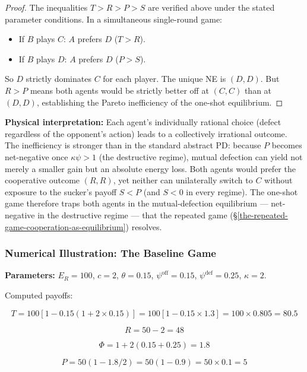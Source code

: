 \documentclass[11pt]{article}
\theoremstyle{plain}
\theoremstyle{definition}
\theoremstyle{remark}
\let\origsubsubsection\subsubsection
\renewcommand{\subsubsection}{\needspace{4\baselineskip}\origsubsubsection}
\begin{document}
\begin{proof}
The inequalities $T > R > P > S$ are verified above under the stated parameter conditions. In a simultaneous single-round game:

\begin{itemize}
\item If $B$ plays $C$: $A$ prefers $D$ ($T > R$).
\item If $B$ plays $D$: $A$ prefers $D$ ($P > S$).
\end{itemize}

So $D$ strictly dominates $C$ for each player. The unique NE is $(D, D)$. But $R > P$ means both agents would be strictly better off at $(C, C)$ than at $(D, D)$, establishing the Pareto inefficiency of the one-shot equilibrium.
\end{proof}

\textbf{Physical interpretation:} Each agent's individually rational
choice (defect regardless of the opponent's action) leads to a
collectively irrational outcome. The inefficiency is stronger than in
the standard abstract PD: because \(P\) becomes net-negative once
\(\kappa\psi > 1\) (the destructive regime), mutual defection can yield
not merely a smaller gain but an absolute energy loss. Both agents would
prefer the cooperative outcome \((R, R)\), yet neither can unilaterally
switch to \(C\) without exposure to the sucker's payoff \(S < P\) (and
\(S < 0\) in every regime). The one-shot game therefore traps both
agents in the mutual-defection equilibrium --- net-negative in the
destructive regime --- that the repeated game
(§\ref{the-repeated-game-cooperation-as-equilibrium}) resolves.

\subsubsection{Numerical Illustration: The Baseline
Game}\label{numerical-illustration-the-baseline-game}

\textbf{Parameters:} \(E_R = 100\), \(c = 2\), \(\theta = 0.15\),
\(\psi^{\text{off}} = 0.15\), \(\psi^{\text{def}} = 0.25\),
\(\kappa = 2\).

Computed payoffs:

\[T = 100[1 - 0.15(1 + 2 \times 0.15)] = 100[1 - 0.15 \times 1.3] = 100 \times 0.805 = 80.5\]

\[R = 50 - 2 = 48\]

\[\Phi = 1 + 2(0.15 + 0.25) = 1.8\]

\[P = 50(1 - 1.8/2) = 50(1 - 0.9) = 50 \times 0.1 = 5\]
\end{document}
